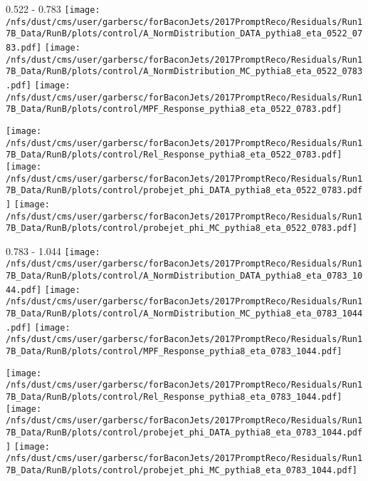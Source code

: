 \documentclass[t,compress]{beamer}
\begin{document}
\begin{frame}{0.522 - 0.783}
	\texttt{[image: /nfs/dust/cms/user/garbersc/forBaconJets/2017PromptReco/Residuals/Run17B\_Data/RunB/plots/control/A\_NormDistribution\_DATA\_pythia8\_eta\_0522\_0783.pdf]}
	\texttt{[image: /nfs/dust/cms/user/garbersc/forBaconJets/2017PromptReco/Residuals/Run17B\_Data/RunB/plots/control/A\_NormDistribution\_MC\_pythia8\_eta\_0522\_0783.pdf]}
	\texttt{[image: /nfs/dust/cms/user/garbersc/forBaconJets/2017PromptReco/Residuals/Run17B\_Data/RunB/plots/control/MPF\_Response\_pythia8\_eta\_0522\_0783.pdf]}
\newline

	\texttt{[image: /nfs/dust/cms/user/garbersc/forBaconJets/2017PromptReco/Residuals/Run17B\_Data/RunB/plots/control/Rel\_Response\_pythia8\_eta\_0522\_0783.pdf]}
	\texttt{[image: /nfs/dust/cms/user/garbersc/forBaconJets/2017PromptReco/Residuals/Run17B\_Data/RunB/plots/control/probejet\_phi\_DATA\_pythia8\_eta\_0522\_0783.pdf]}
	\texttt{[image: /nfs/dust/cms/user/garbersc/forBaconJets/2017PromptReco/Residuals/Run17B\_Data/RunB/plots/control/probejet\_phi\_MC\_pythia8\_eta\_0522\_0783.pdf]}
\end{frame}

\begin{frame}{0.783 - 1.044}
	\texttt{[image: /nfs/dust/cms/user/garbersc/forBaconJets/2017PromptReco/Residuals/Run17B\_Data/RunB/plots/control/A\_NormDistribution\_DATA\_pythia8\_eta\_0783\_1044.pdf]}
	\texttt{[image: /nfs/dust/cms/user/garbersc/forBaconJets/2017PromptReco/Residuals/Run17B\_Data/RunB/plots/control/A\_NormDistribution\_MC\_pythia8\_eta\_0783\_1044.pdf]}
	\texttt{[image: /nfs/dust/cms/user/garbersc/forBaconJets/2017PromptReco/Residuals/Run17B\_Data/RunB/plots/control/MPF\_Response\_pythia8\_eta\_0783\_1044.pdf]}
\newline

	\texttt{[image: /nfs/dust/cms/user/garbersc/forBaconJets/2017PromptReco/Residuals/Run17B\_Data/RunB/plots/control/Rel\_Response\_pythia8\_eta\_0783\_1044.pdf]}
	\texttt{[image: /nfs/dust/cms/user/garbersc/forBaconJets/2017PromptReco/Residuals/Run17B\_Data/RunB/plots/control/probejet\_phi\_DATA\_pythia8\_eta\_0783\_1044.pdf]}
	\texttt{[image: /nfs/dust/cms/user/garbersc/forBaconJets/2017PromptReco/Residuals/Run17B\_Data/RunB/plots/control/probejet\_phi\_MC\_pythia8\_eta\_0783\_1044.pdf]}
\end{frame}
\end{document}
